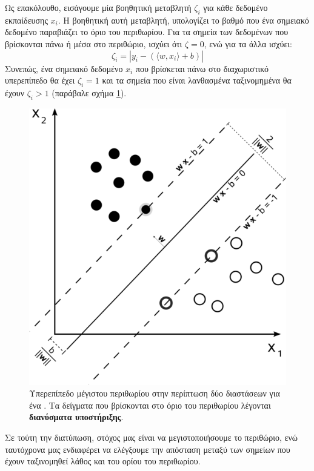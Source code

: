 Ως επακόλουθο, εισάγουμε μία βοηθητική μεταβλητή $\zeta_{i}$ για κάθε δεδομένο εκπαίδευσης $x_{i}$.
Η βοηθητική αυτή μεταβλητή, υπολογίζει το βαθμό που ένα σημειακό δεδομένο παραβιάζει το όριο του περιθωρίου.
Για τα σημεία των δεδομένων που βρίσκονται πάνω ή μέσα στο περιθώριο, ισχύει ότι $\zeta = 0$, ενώ για τα άλλα ισχύει:
\begin{equation}
\zeta_{i} = | y_{i} - (\langle w, x_{i} \rangle + b )|    
\end{equation}
Συνεπώς, ένα σημειακό δεδομένο $x_{i}$ που βρίσκεται πάνω στο διαχωριστικό υπερεπίπεδο θα έχει $\zeta_{i} = 1$ και τα σημεία που είναι λανθασμένα ταξινομημένα θα έχουν $\zeta_{i} > 1$ (παράβαλε σχήμα \ref{fig:svm_sep}).
\begin{figure}
    \centering
    \includegraphics[scale=0.6]{figures/556px-Svm_max_sep_hyperplane_with_margin.png}
    \caption[Υπερεπίπεδο μέγιστου περιθωρίου στην περίπτωση δύο διαστάσεων για ένα .]{Υπερεπίπεδο μέγιστου περιθωρίου στην περίπτωση δύο διαστάσεων για ένα . Τα δείγματα που βρίσκονται στο όριο του περιθωρίου λέγονται \textbf{διανύσματα υποστήριξης}.}
    \label{fig:svm_sep}
\end{figure}
Σε τούτη την διατύπωση, στόχος μας είναι να μεγιστοποιήσουμε το περιθώριο, ενώ ταυτόχρονα μας ενδιαφέρει να ελέγξουμε την απόσταση μεταξύ των σημείων που έχουν ταξινομηθεί λάθος και του ορίου του περιθωρίου.
